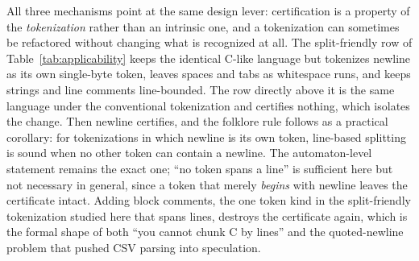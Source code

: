 \documentclass[11pt,a4paper]{article}
\theoremstyle{definition}
\theoremstyle{plain}
\begin{document}
All three mechanisms point at the same design lever: certification is a property of the \emph{tokenization} rather
than an intrinsic one, and a tokenization can sometimes be refactored without changing what is recognized at all. The
split-friendly row of Table~\ref{tab:applicability} keeps the identical C-like language but tokenizes newline as its
own single-byte token, leaves spaces and tabs as whitespace runs, and keeps strings and line comments line-bounded.
The row directly above it is the same language under the conventional tokenization and certifies nothing, which
isolates the change. Then newline certifies, and the folklore rule follows as a practical corollary: for tokenizations
in which newline is its own token, line-based splitting is sound when no other token can contain a newline. The
automaton-level statement remains the exact one; ``no token spans a line'' is sufficient here but not necessary in
general, since a token that merely \emph{begins} with newline leaves the certificate intact. Adding block comments,
the one token kind in the split-friendly tokenization studied here that spans lines, destroys the certificate again,
which is the formal shape of both ``you cannot chunk C by lines'' and the quoted-newline problem that pushed CSV
parsing into speculation.
\end{document}
